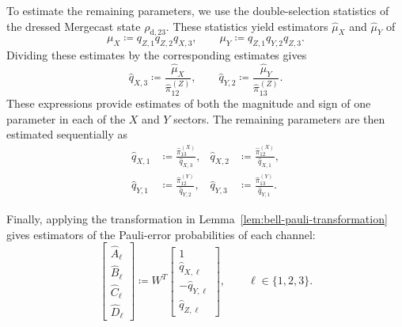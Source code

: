 To estimate the remaining parameters, we use the double-selection
statistics of the dressed Mergecast state $\rho_{\text{d},23}$.
These statistics yield estimators $\widehat{\mu}_X$ and
$\widehat{\mu}_Y$ of
\[
    \mu_X\coloneqq q_{Z,1}q_{Z,2}q_{X,3},
    \qquad
    \mu_Y\coloneqq q_{Z,1}q_{Y,2}q_{Z,3}.
\]
Dividing these estimates by the corresponding  estimates gives
\begin{equation}
    \widehat{q}_{X,3}
    \coloneqq
    \frac{\widehat{\mu}_X}{\widehat{\pi}_{12}^{(Z)}},
    \qquad
    \widehat{q}_{Y,2}
    \coloneqq
    \frac{\widehat{\mu}_Y}{\widehat{\pi}_{13}^{(Z)}}.
    \label{eq:reference-parameter-reconstruction}
\end{equation}
These expressions provide estimates of both the magnitude and sign
of one parameter in each of the $X$ and $Y$ sectors.
The remaining parameters are then estimated sequentially as
\begin{equation}
    \begin{aligned}
        \widehat{q}_{X,1}
         & \coloneqq
        \frac{\widehat{\pi}_{13}^{(X)}}{\widehat{q}_{X,3}},
         &
        \widehat{q}_{X,2}
         & \coloneqq
        \frac{\widehat{\pi}_{12}^{(X)}}{\widehat{q}_{X,1}}, \\
        \widehat{q}_{Y,1}
         & \coloneqq
        \frac{\widehat{\pi}_{12}^{(Y)}}{\widehat{q}_{Y,2}},
         &
        \widehat{q}_{Y,3}
         & \coloneqq
        \frac{\widehat{\pi}_{13}^{(Y)}}{\widehat{q}_{Y,1}}.
    \end{aligned}
    \label{eq:remaining-parameter-reconstruction}
\end{equation}

Finally, applying the transformation in
Lemma~\ref{lem:bell-pauli-transformation} gives estimators
of the Pauli-error probabilities of each channel:
\begin{equation}
    \begin{bmatrix}
        \widehat{A}_\ell \\
        \widehat{B}_\ell \\
        \widehat{C}_\ell \\
        \widehat{D}_\ell
    \end{bmatrix}
    \coloneqq
    W^{ T}
    \begin{bmatrix}
        1                     \\
        \widehat{q}_{X,\ell}  \\
        -\widehat{q}_{Y,\ell} \\
        \widehat{q}_{Z,\ell}
    \end{bmatrix},
    \qquad \ell\in\{1,2,3\}.
    \label{eq:channel-probability-reconstruction}
\end{equation}

